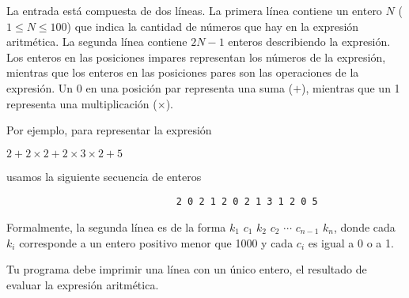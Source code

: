 \documentclass{oci}
\begin{document}
\begin{problemDescription}

\end{problemDescription}

\begin{inputDescription}
  La entrada está compuesta de dos líneas.
  La primera línea contiene un entero $N$ ($1\leq N\leq 100$) que indica la
  cantidad de números que hay en la expresión aritmética.
  La segunda línea contiene $2N-1$ enteros describiendo la expresión.
  Los enteros en las posiciones impares representan los números de la expresión,
  mientras que los enteros en las posiciones pares son las operaciones de la
  expresión.
  Un 0 en una posición par representa una suma ($+$), mientras que un 1
  representa una multiplicación ($\times$). 

  \newpage
  Por ejemplo, para representar la expresión

\vspace{-0.5em}
\begin{minipage}{\textwidth}
  \centering
$2 + 2 \times 2 + 2\times 3 \times 2 + 5$
\end{minipage}
\vspace{-1em}
usamos la siguiente secuencia de enteros
\begin{verbatim}
                              2 0 2 1 2 0 2 1 3 1 2 0 5
\end{verbatim}

  Formalmente, la segunda línea es de la forma $k_1$ $c_1$ $k_2$ $c_2$ $\cdots$
  $c_{n-1}$ $k_n$, donde cada $k_i$ corresponde a un entero positivo menor que
  1000 y cada $c_i$ es igual a 0 o a 1.
\end{inputDescription}

\begin{outputDescription}
Tu programa debe imprimir una línea con un único entero, el resultado de evaluar la
expresión aritmética.
\end{outputDescription}
\end{document}
